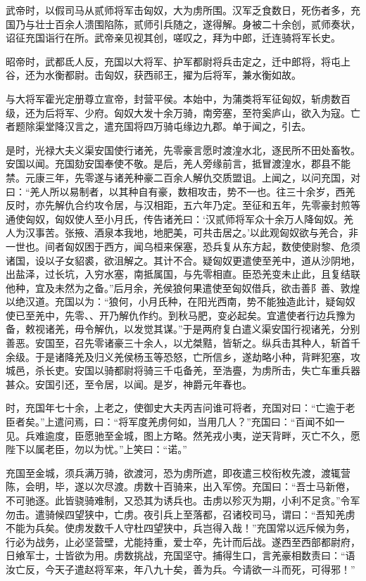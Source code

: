 \documentclass[12pt,UTF8]{ctexbook}
\begin{document}
武帝时，以假司马从贰师将军击匈奴，大为虏所围。汉军乏食数日，死伤者多，充国乃与壮士百余人溃围陷陈，贰师引兵随之，遂得解。身被二十余创，贰师奏状，诏征充国诣行在所。武帝亲见视其创，嗟叹之，拜为中郎，迁连骑将军长史。



昭帝时，武都氐人反，充国以大将军、护军都尉将兵击定之，迁中郎将，将屯上谷，还为水衡都尉。击匈奴，获西祁王，擢为后将军，兼水衡如故。



与大将军霍光定册尊立宣帝，封营平侯。本始中，为蒲类将军征匈奴，斩虏数百级，还为后将军、少府。匈奴大发十余万骑，南旁塞，至符奚庐山，欲入为寇。亡者题除渠堂降汉言之，遣充国将四万骑屯缘边九郡。单于闻之，引去。



是时，光禄大夫义渠安国使行诸羌，先零豪言愿时渡湟水北，逐民所不田处畜牧。安国以闻。充国劾安国奉使不敬。是后，羌人旁缘前言，抵冒渡湟水，郡县不能禁。元康三年，先零遂与诸羌种豪二百余人解仇交质盟诅。上闻之，以问充国，对曰：“羌人所以易制者，以其种自有豪，数相攻击，势不一也。往三十余岁，西羌反时，亦先解仇合约攻令居，与汉相距，五六年乃定。至征和五年，先零豪封煎等通使匈奴，匈奴使人至小月氏，传告诸羌曰：‘汉贰师将军众十余万人降匈奴。羌人为汉事苦。张掖、酒泉本我地，地肥美，可共击居之。’以此观匈奴欲与羌合，非一世也。间者匈奴困于西方，闻乌桓来保塞，恐兵复从东方起，数使使尉黎、危须诸国，设以子女貂裘，欲沮解之。其计不合。疑匈奴更遣使至羌中，道从沙阴地，出盐泽，过长坑，入穷水塞，南抵属国，与先零相直。臣恐羌变未止此，且复结联他种，宜及未然为之备。”后月余，羌侯狼何果遣使至匈奴借兵，欲击善阝善、敦煌以绝汉道。充国以为：“狼何，小月氏种，在阳光西南，势不能独造此计，疑匈奴使已至羌中，先零、、开乃解仇作约。到秋马肥，变必起矣。宜遣使者行边兵豫为备，敕视诸羌，毋令解仇，以发觉其谋。”于是两府复白遣义渠安国行视诸羌，分别善恶。安国至，召先零诸豪三十余人，以尤桀黠，皆斩之。纵兵击其种人，斩首千余级。于是诸降羌及归义羌侯杨玉等恐怒，亡所信乡，遂劫略小种，背畔犯塞，攻城邑，杀长吏。安国以骑都尉将骑三千屯备羌，至浩亹，为虏所击，失亡车重兵器甚众。安国引还，至令居，以闻。是岁，神爵元年春也。



时，充国年七十余，上老之，使御史大夫丙吉问谁可将者，充国对曰：“亡逾于老臣者矣。”上遣问焉，曰：“将军度羌虏何如，当用几人？”充国曰：“百闻不如一见。兵难逾度，臣愿驰至金城，图上方略。然羌戎小夷，逆天背畔，灭亡不久，愿陛下以属老臣，勿以为忧。”上笑曰：“诺。”



充国至金城，须兵满万骑，欲渡河，恐为虏所遮，即夜遣三校衔枚先渡，渡辄营陈，会明，毕，遂以次尽渡。虏数十百骑来，出入军傍。充国曰：“吾士马新倦，不可驰逐。此皆骁骑难制，又恐其为诱兵也。击虏以殄灭为期，小利不足贪。”令军勿击。遣骑候四望狭中，亡虏。夜引兵上至落都，召诸校司马，谓曰：“吾知羌虏不能为兵矣。使虏发数千人守杜四望狭中，兵岂得入哉！”充国常以远斥候为务，行必为战务，止必坚营壁，尤能持重，爱士卒，先计而后战。遂西至西部都尉府，日飨军士，士皆欲为用。虏数挑战，充国坚守。捕得生口，言羌豪相数责曰：“语汝亡反，今天子遣赵将军来，年八九十矣，善为兵。今请欲一斗而死，可得邪！”
\end{document}
